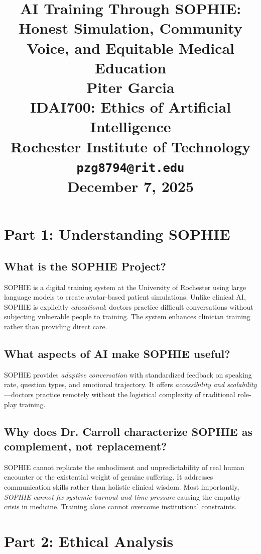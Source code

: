 \documentclass[12pt,twoside]{article}
\title{
\vspace*{1.5in}
\textbf{\Huge AI Training Through SOPHIE:}\\[0.5em]
\textbf{\Huge Honest Simulation, Community Voice, and Equitable Medical Education}\\[1.5em]

\vfill
\Huge \textbf{Piter Garcia}\\
\LARGE IDAI700: Ethics of Artificial Intelligence\\
Rochester Institute of Technology\\
\texttt{pzg8794@rit.edu}\\

\vfill
\Huge \textbf{December 7, 2025}
}
\author{}
\date{}
\begin{document}
\thispagestyle{empty}
\maketitle
\newpage

\pagestyle{fancy}

\section*{Part 1: Understanding SOPHIE}

\subsection*{What is the SOPHIE Project?}

SOPHIE is a digital training system at the University of Rochester using large language models to create avatar-based patient simulations. Unlike clinical AI, SOPHIE is explicitly \emph{educational}: doctors practice difficult conversations without subjecting vulnerable people to training. The system enhances clinician training rather than providing direct care.

\subsection*{What aspects of AI make SOPHIE useful?}

SOPHIE provides \emph{adaptive conversation} with standardized feedback on speaking rate, question types, and emotional trajectory. It offers \emph{accessibility and scalability}—doctors practice remotely without the logistical complexity of traditional role-play training.

\subsection*{Why does Dr. Carroll characterize SOPHIE as complement, not replacement?}

SOPHIE cannot replicate the embodiment and unpredictability of real human encounter or the existential weight of genuine suffering. It addresses communication skills rather than holistic clinical wisdom. Most importantly, \emph{SOPHIE cannot fix systemic burnout and time pressure} causing the empathy crisis in medicine. Training alone cannot overcome institutional constraints.

\section*{Part 2: Ethical Analysis}
\end{document}
